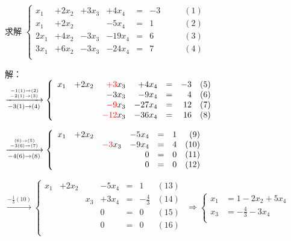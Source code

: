 \begin{frame}
\begin{example}[存在不唯一]
求解 $\left\{\begin{array}{rrrrrrr}
x_1 & +2x_2 & +3x_3 &  +4x_4 & = & -3 &  \qquad (1)\\
x_1 & +2x_2 &       &  -5x_4 & = &  1 &  \qquad (2)\\
2x_1 & +4x_2 & -3x_3 & -19x_4 & = &  6 &  \qquad (3)\\
3x_1 & +6x_2 & -3x_3 & -24x_4 & = &  7 &  \qquad (4)\\
\end{array}\right.$
\end{example} \pp
{\tiny 解：\\
$\xrightarrow[-3(1)\rightarrow(4)]{- 1(1)\rightarrow(2) \atop -2(1)\rightarrow(3)}
\left\{\begin{array}{rrrrrrr}
x_1 & +2x_2 & \red{+3}x_3 &  +4x_4 & = &  -3 &    (5)\\
&       & -3x_3 &  -9x_4 & = &   4 &    (6)\\
&       & \red{-9}x_3 & -27x_4 & = &  12 &    (7)\\
&       &\red{-12}x_3 & -36x_4 & = &  16 &    (8)\\
\end{array}\right.
$ \pp
\bigskip

$\xrightarrow[-4(6)\rightarrow(8)]{(6)\rightarrow(5)\atop -3(6)\rightarrow(7)}
\left\{\begin{array}{rrrrrrr}
x_1 & +2x_2 &  &  -5x_4 & = &  1 &    (9)\\
&       & \red{-3}x_3 &  -9x_4 & = &   4 &    (10)\\
&       &       &      0 & = &  0 &    (11)\\
&       &       &      0 & = &  0 &    (12)\\
\end{array}\right.
$ \pp
\bigskip

$\xrightarrow{-\frac13(10)}
\left\{\begin{array}{rrrrrrr}
x_1 & +2x_2 &  &  -5x_4 & = &  1 &    (13)\\
&       & x_3 &  +3x_4 & = &   -\frac43 &    (14)\\
&       &       &      0 & = &  0 &    (15)\\
&       &       &      0 & = &  0 &    (16)\\
\end{array}\right.
$ \pp
$\Rightarrow \left\{
\begin{array}{rl}
x_1 &= 1-2x_2+5x_4\\
x_3 &= -\frac43 - 3x_4\\
\end{array}
\right.$
\\ \pp
\bigskip

}
\end{frame}

